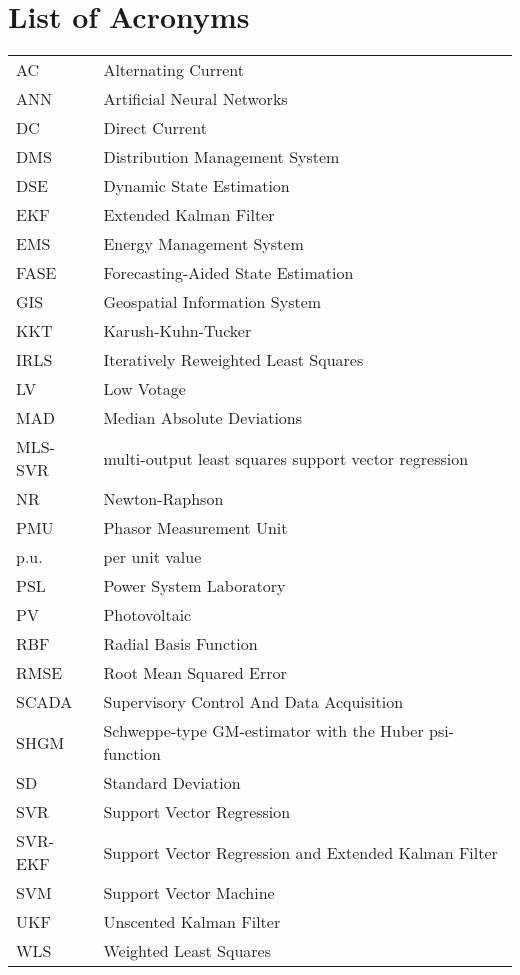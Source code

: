 \chapter*{List of Acronyms}\sloppy
{}
\begin{tabular}{ll}
AC & Alternating Current \\
ANN & Artificial Neural Networks \\ 
DC & Direct Current \\
DMS & Distribution Management System \\
DSE & Dynamic State Estimation\\
EKF & Extended Kalman Filter \\
EMS & Energy Management System \\
FASE & Forecasting-Aided State Estimation \\
GIS & Geospatial Information System\\
KKT & Karush-Kuhn-Tucker\\
IRLS & Iteratively Reweighted Least Squares\\
LV & Low Votage\\
MAD & Median Absolute Deviations\\
MLS-SVR & multi-output least squares support vector regression\\
NR & Newton-Raphson\\
PMU & Phasor Measurement Unit \\
p.u. & per unit value\\
PSL & Power System Laboratory\\
PV & Photovoltaic\\
RBF & Radial Basis Function\\
RMSE & Root Mean Squared Error\\
SCADA & Supervisory Control And Data Acquisition \\
SHGM & Schweppe-type GM-estimator with the Huber psi-function \\
SD & Standard Deviation \\
SVR & Support Vector Regression\\
SVR-EKF & Support Vector Regression and Extended Kalman Filter\\
SVM & Support Vector Machine\\
UKF & Unscented Kalman Filter \\
WLS & Weighted Least Squares \\

\end{tabular}

\newpage





